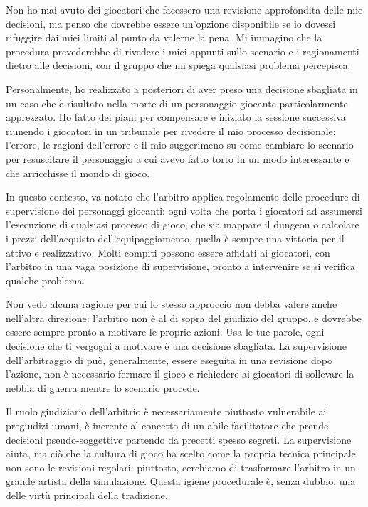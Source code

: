 Non ho mai avuto dei giocatori che facessero una revisione approfondita delle mie decisioni, ma penso che dovrebbe essere un'opzione disponibile se io dovessi rifuggire dai miei limiti al punto da valerne la pena. Mi immagino che la procedura prevederebbe di rivedere i miei appunti sullo scenario e i ragionamenti dietro alle decisioni, con il gruppo che mi spiega qualsiasi problema percepisca.

Personalmente, ho realizzato a posteriori di aver preso una decisione sbagliata in un caso che è risultato nella morte di un personaggio giocante particolarmente apprezzato. Ho fatto dei piani per compensare e iniziato la sessione successiva riunendo i giocatori in un tribunale per rivedere il mio processo decisionale: l'errore, le ragioni dell'errore e il mio suggerimeno su come cambiare lo scenario per resuscitare il personaggio a cui avevo fatto torto in un modo interessante e che arricchisse il mondo di gioco.

In questo contesto, va notato che l'arbitro applica regolamente delle procedure di supervisione dei personaggi giocanti: ogni volta che porta i giocatori ad assumersi l'esecuzione di qualsiasi processo di gioco, che sia mappare il dungeon o calcolare i prezzi dell'acquisto dell'equipaggiamento, quella è sempre una vittoria per il  attivo e realizzativo. Molti compiti possono essere affidati ai giocatori, con l'arbitro in una vaga posizione di supervisione, pronto a intervenire se si verifica qualche problema.

Non vedo alcuna ragione per cui lo stesso approccio non debba valere anche nell'altra direzione: l'arbitro non è al di sopra del giudizio del gruppo, e dovrebbe essere sempre pronto a motivare le proprie azioni. Usa le tue parole, ogni decisione che ti vergogni a motivare è una decisione sbagliata. La supervisione dell'arbitraggio di \dnd{} può, generalmente, essere eseguita in una revisione dopo l'azione, non è necessario fermare il gioco e richiedere ai giocatori di sollevare la nebbia di guerra mentre lo scenario procede.


Il ruolo giudiziario dell'arbitrio è necessariamente piuttosto vulnerabile ai pregiudizi umani, è inerente al concetto di un abile facilitatore che prende decisioni pseudo-soggettive partendo da precetti spesso segreti. La supervisione aiuta, ma ciò che la cultura di gioco ha scelto come la propria tecnica principale non sono le revisioni regolari: piuttosto, cerchiamo di trasformare l'arbitro in un grande artista della simulazione. Questa igiene procedurale è, senza dubbio, una delle virtù principali della tradizione.

